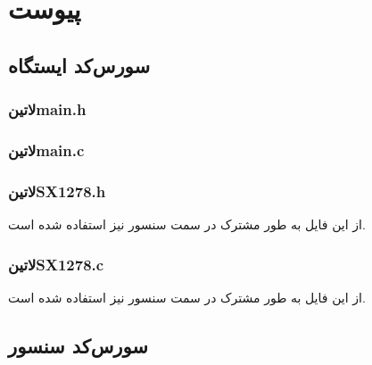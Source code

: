 \clearpage
{}
{}
\chapter*{پیوست}

\section*{سورس‌کد ایستگاه}

\subsection*{‌لاتین{main.h}}
\begin{latin}
	
\end{latin}

\subsection*{‌لاتین{main.c}}
\begin{latin}
	
\end{latin}

\subsection*{‌لاتین{SX1278.h}}\label{SX1278.h}
از این فایل به طور مشترک در سمت سنسور نیز استفاده شده است.
\begin{latin}
	
\end{latin}

\subsection*{‌لاتین{SX1278.c}}\label{SX1278.c}
از این فایل به طور مشترک در سمت سنسور نیز استفاده شده است.
\begin{latin}
	
\end{latin}

\section*{سورس‌کد سنسور}


